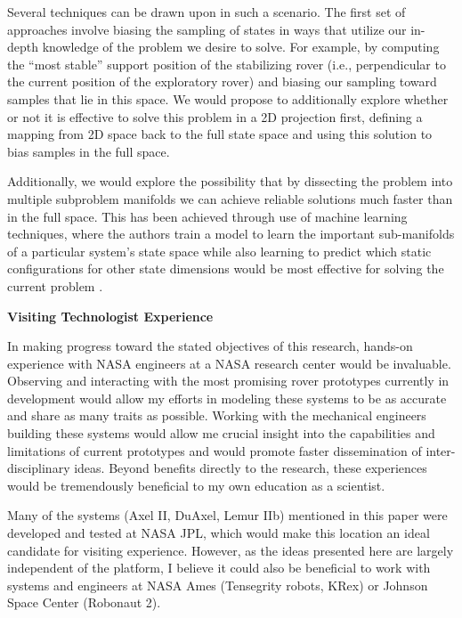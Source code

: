 \documentclass[12pt]{article}
\begin{document}
Several techniques can be drawn upon in such a scenario. The first set of approaches involve biasing the sampling of states 
in ways that utilize our in-depth knowledge of the problem we desire to solve. For example, by computing the ``most stable'' support 
position of the stabilizing rover (i.e., perpendicular to the current position of the exploratory rover) 
and biasing our sampling toward samples that lie in this space. We would propose to additionally explore whether or not 
it is effective to solve this problem in a 2D projection first, defining a mapping from 2D space back to the full state space 
and using this solution to bias samples in the full space. 

Additionally, we would explore the possibility that by dissecting the problem into multiple subproblem manifolds we can achieve reliable 
solutions much faster than in the full space. This has been achieved through use of machine learning techniques, where the authors 
train a model to learn the important sub-manifolds of a particular system's state space while also learning to predict which static 
configurations for other state dimensions would be most effective for solving the current problem \cite{learning_biases}. 


{\bf\noindent Visiting Technologist Experience}

In making progress toward the stated objectives of this research, hands-on experience with NASA 
engineers at a NASA research center would be invaluable. Observing and interacting with the most promising 
rover prototypes currently in development would allow my efforts in modeling these systems to be as accurate 
and share as many traits as possible. Working with the mechanical engineers building these systems would 
allow me crucial insight into the capabilities and limitations of current prototypes and would promote 
faster dissemination of inter-disciplinary ideas. Beyond benefits directly to the research, these experiences 
would be tremendously beneficial to my own education as a scientist. 

Many of the systems (Axel II, DuAxel, Lemur IIb) mentioned in this paper were developed and tested at NASA 
JPL, which would make this location an ideal candidate for visiting experience. However, as the ideas presented here 
are largely independent of the platform, I believe it could also be beneficial to work with systems and 
engineers at NASA Ames (Tensegrity robots, KRex) or Johnson Space Center (Robonaut 2).





\newpage

\small{}

\end{document}
